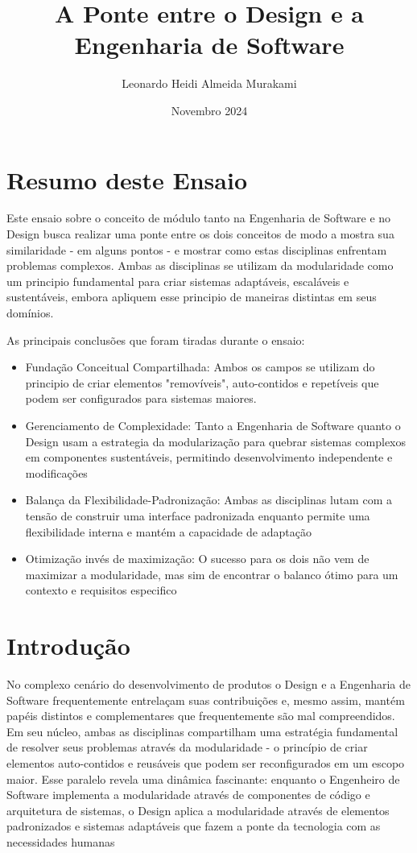 \documentclass[12pt]{article}
\title{A Ponte entre o Design e a Engenharia de Software}
\author{Leonardo Heidi Almeida Murakami}
\affil{Instituto de Matemática e Estatística, Universidade de São Paulo}
\date{Novembro 2024}
\begin{document}
\maketitle
\section{Resumo deste Ensaio}
Este ensaio sobre o conceito de módulo tanto na Engenharia de Software e no Design busca realizar uma ponte entre os dois conceitos de modo a mostra sua similaridade - em alguns pontos - e mostrar como estas disciplinas enfrentam problemas complexos. Ambas as disciplinas se utilizam da modularidade como um principio fundamental para criar sistemas adaptáveis, escaláveis e sustentáveis, embora apliquem esse principio de maneiras distintas em seus domínios.


\noindent
As principais conclusões que foram tiradas durante o ensaio:
\begin{itemize}
    \item Fundação Conceitual Compartilhada: Ambos os campos se utilizam do principio de criar elementos "removíveis", auto-contidos e repetíveis que podem ser configurados para sistemas maiores.
    \item Gerenciamento de Complexidade: Tanto a Engenharia de Software quanto o Design usam a estrategia da modularização para quebrar sistemas complexos em componentes sustentáveis, permitindo desenvolvimento independente e modificações
    \item Balança da Flexibilidade-Padronização: Ambas as disciplinas lutam com a tensão de construir uma interface padronizada enquanto permite uma flexibilidade interna e mantém a capacidade de adaptação
    \item Otimização invés de maximização: O sucesso para os dois não vem de maximizar a modularidade, mas sim de encontrar o balanco ótimo para um contexto e requisitos especifico
\end{itemize}
\section{Introdução}

No complexo cenário do desenvolvimento de produtos o Design e a Engenharia de Software frequentemente entrelaçam suas contribuições e, mesmo assim, mantém papéis distintos e complementares que frequentemente são mal compreendidos. Em seu núcleo, ambas as disciplinas compartilham uma estratégia fundamental de resolver seus problemas através da modularidade - o princípio de criar elementos auto-contidos e reusáveis que podem ser reconfigurados em um escopo maior. Esse paralelo revela uma dinâmica fascinante: enquanto o Engenheiro de Software implementa a modularidade através de componentes de código e arquitetura de sistemas, o Design aplica a modularidade através de elementos padronizados e sistemas adaptáveis que fazem a ponte da tecnologia com as necessidades humanas
\end{document}
